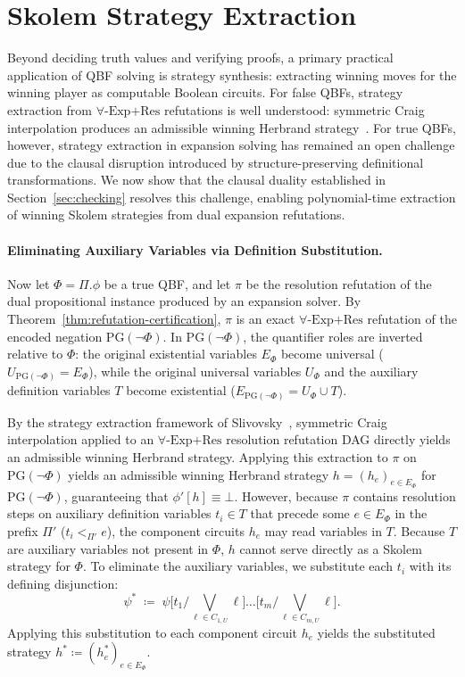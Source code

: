 \documentclass[runningheads]{llncs}
\newcommand{\ExpRes}{\forall\text{-}\mathrm{Exp}\text{+}\mathrm{Res}}
\newcommand{\PG}{\mathrm{PG}}
\begin{document}
\section{Skolem Strategy Extraction}
\label{sec:extraction}

Beyond deciding truth values and verifying proofs, a primary practical application of QBF solving is strategy synthesis: extracting winning moves for the winning player as computable Boolean circuits.
For false QBFs, strategy extraction from $\ExpRes$ refutations is well understood: symmetric Craig interpolation produces an admissible winning Herbrand strategy~\cite{slivovsky2024,schlaipfer2020}.
For true QBFs, however, strategy extraction in expansion solving has remained an open challenge due to the clausal disruption introduced by structure-preserving definitional transformations.
We now show that the clausal duality established in Section~\ref{sec:checking} resolves this challenge, enabling polynomial-time extraction of winning Skolem strategies from dual expansion refutations.

\paragraph*{Eliminating Auxiliary Variables via Definition Substitution.}
Now let $\Phi = \Pi.\phi$ be a true QBF, and let $\pi$ be the resolution refutation of the dual propositional instance produced by an expansion solver.
By Theorem~\ref{thm:refutation-certification}, $\pi$ is an exact $\ExpRes$ refutation of the encoded negation $\PG(\neg\Phi)$.
In $\PG(\neg\Phi)$, the quantifier roles are inverted relative to $\Phi$: the original existential variables $E_\Phi$ become universal ($U_{\PG(\neg\Phi)} = E_\Phi$), while the original universal variables $U_\Phi$ and the auxiliary definition variables $T$ become existential ($E_{\PG(\neg\Phi)} = U_\Phi \cup T$).

By the strategy extraction framework of Slivovsky~\cite{slivovsky2024}, symmetric Craig interpolation applied to an $\ExpRes$ resolution refutation DAG directly yields an admissible winning Herbrand strategy.
Applying this extraction to $\pi$ on $\PG(\neg\Phi)$ yields an admissible winning Herbrand strategy $h = (h_e)_{e \in E_\Phi}$ for $\PG(\neg\Phi)$, guaranteeing that $\phi'[h] \equiv \bot$.
However, because $\pi$ contains resolution steps on auxiliary definition variables $t_i \in T$ that precede some $e \in E_\Phi$ in the prefix $\Pi'$ ($t_i <_{\Pi'} e$), the component circuits $h_e$ may read variables in $T$.
Because $T$ are auxiliary variables not present in $\Phi$, $h$ cannot serve directly as a Skolem strategy for $\Phi$.
To eliminate the auxiliary variables, we substitute each $t_i$ with its defining disjunction:
\begin{equation}
    \label{eq:substitution}
    \psi^* \;\coloneqq\; \psi\big[t_1 / \textstyle\bigvee_{\ell \in C_{1,U}} \ell\big] \dots \big[t_m / \textstyle\bigvee_{\ell \in C_{m,U}} \ell\big] .
\end{equation}
Applying this substitution to each component circuit $h_e$ yields the substituted strategy $h^* \coloneqq (h_e^*)_{e \in E_\Phi}$.
\end{document}
